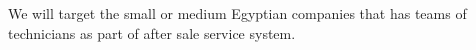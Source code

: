 We will target the small or medium Egyptian companies that has teams of technicians as part of after sale service system.